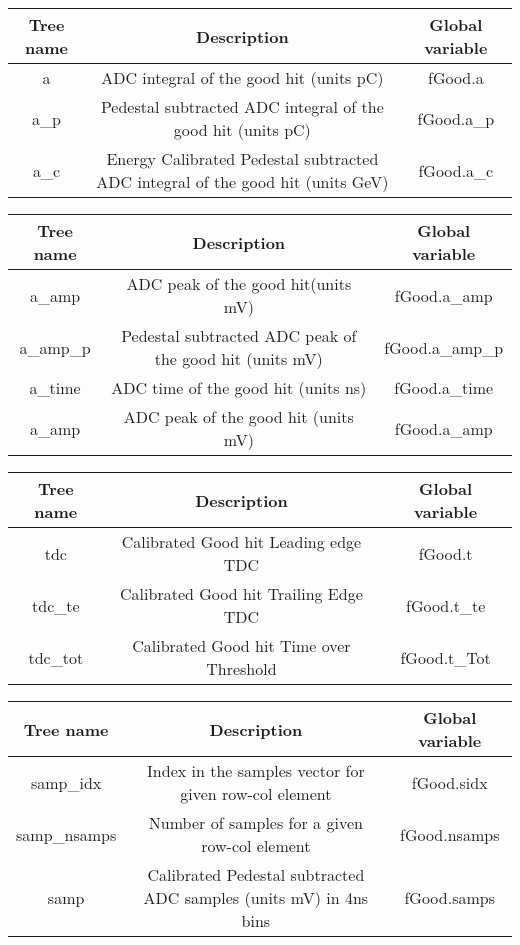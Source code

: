 \documentclass[11pt]{article}
\begin{document}
\begin{center}
\begin{tabular}{|c|c|c|}
	\hline 
Tree name	& Description &  Global variable\\ 
	\hline 
a	& ADC integral of the good hit (units pC)  &fGood.a  \\ 
	\hline 
a\_p	& Pedestal subtracted ADC integral of the good hit  (units pC) & fGood.a\_p \\ 
	\hline 
a\_c	& Energy Calibrated Pedestal subtracted ADC integral of the good hit (units GeV) & fGood.a\_c \\ 
\end{tabular} 
\end{center}

\begin{center}
\begin{tabular}{|c|c|c|}
	\hline 
Tree name	& Description &  Global variable\\ 
	\hline 
a\_amp	& ADC peak of the good hit(units mV)  &fGood.a\_amp  \\ 
\hline 
a\_amp\_p	& Pedestal subtracted ADC peak of the good hit (units mV) & fGood.a\_amp\_p \\ 
\hline 
a\_time	& ADC time of the good hit  (units ns)  &fGood.a\_time  \\ 
\hline 
a\_amp	& ADC peak of the good hit (units mV)  &fGood.a\_amp  \\ 
\hline 
\end{tabular} 
\end{center}


\begin{center}
\begin{tabular}{|c|c|c|}
	\hline 
	Tree name	& Description &  Global variable\\ 
	\hline 
	tdc 	& Calibrated Good hit Leading edge TDC  &fGood.t  \\ 
\hline 
	tdc\_te 	& Calibrated  Good hit Trailing Edge TDC  &fGood.t\_te  \\ 
\hline 
	tdc\_tot 	& Calibrated  Good hit Time over Threshold  &fGood.t\_Tot  \\ 
\hline 
\end{tabular} 
\end{center}


\begin{center}
	\begin{tabular}{|c|c|c|}
	\hline 
	Tree name	& Description &  Global variable\\ 
	\hline 
	samp\_idx 	& Index in the samples vector for given row-col element &fGood.sidx  \\ 
	\hline 
	samp\_nsamps	& Number of samples for a given row-col element &fGood.nsamps  \\ 
\hline 
	samp 	& Calibrated Pedestal subtracted ADC samples (units mV) in 4ns bins &fGood.samps  \\ 
\hline 
\end{tabular} 
\end{center}
\end{document}
